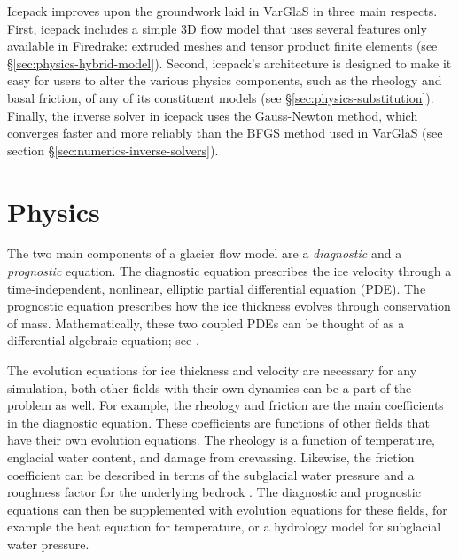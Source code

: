 \documentclass[journal abbreviation, manuscript]{copernicus}
\begin{document}
Icepack improves upon the groundwork laid in VarGlaS in three main respects.
First, icepack includes a simple 3D flow model that uses several features only available in Firedrake: extruded meshes and tensor product finite elements \citep{bercea2016structure, mcrae2016automated} (see \S\ref{sec:physics-hybrid-model}).
Second, icepack's architecture is designed to make it easy for users to alter the various physics components, such as the rheology and basal friction, of any of its constituent models (see \S\ref{sec:physics-substitution}).
Finally, the inverse solver in icepack uses the Gauss-Newton method, which converges faster and more reliably than the BFGS method used in VarGlaS (see section \S\ref{sec:numerics-inverse-solvers}).


\section{Physics}

The two main components of a glacier flow model are a \emph{diagnostic} and a \emph{prognostic} equation.
The diagnostic equation prescribes the ice velocity through a time-independent, nonlinear, elliptic partial differential equation (PDE).
The prognostic equation prescribes how the ice thickness evolves through conservation of mass.
Mathematically, these two coupled PDEs can be thought of as a differential-algebraic equation; see \citet{ascher1998computer}.

The evolution equations for ice thickness and velocity are necessary for any simulation, both other fields with their own dynamics can be a part of the problem as well.
For example, the rheology and friction are the main coefficients in the diagnostic equation.
These coefficients are functions of other fields that have their own evolution equations.
The rheology is a function of temperature, englacial water content, and damage from crevassing.
Likewise, the friction coefficient can be described in terms of the subglacial water pressure and a roughness factor for the underlying bedrock \citep{cuffey2010physics}.
The diagnostic and prognostic equations can then be supplemented with evolution equations for these fields, for example the heat equation for temperature, or a hydrology model for subglacial water pressure.
\end{document}
